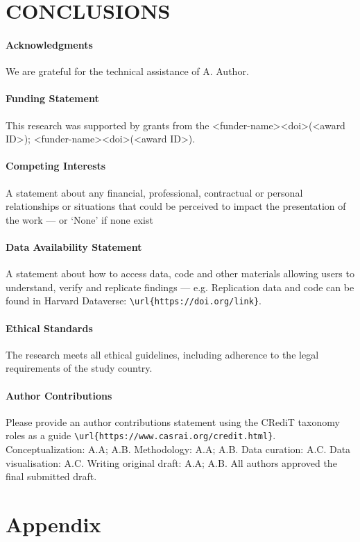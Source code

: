 \documentclass[
  journal=pasa,
  manuscript=research-paper,
  year=202X,
  volume=YY,
]{cup-journal}
\begin{document}
\section{CONCLUSIONS}
\label{sec:conclusions}

\newpage
\paragraph{Acknowledgments}
We are grateful for the technical assistance of A. Author.

\paragraph{Funding Statement}
This research was supported by grants from the <funder-name><doi>(<award ID>); <funder-name><doi>(<award ID>).

\paragraph{Competing Interests}
A statement about any financial, professional, contractual or personal relationships or situations that could be perceived to impact the presentation of the work --- or `None' if none exist

\paragraph{Data Availability Statement}
A statement about how to access data, code and other materials allowing users to understand, verify and replicate findings --- e.g. Replication data and code can be found in Harvard Dataverse: \verb+\url{https://doi.org/link}+.

\paragraph{Ethical Standards}
The research meets all ethical guidelines, including adherence to the legal requirements of the study country.

\paragraph{Author Contributions}
Please provide an author contributions statement using the CRediT taxonomy roles as a guide {\verb+\url{https://www.casrai.org/credit.html}+}. Conceptualization: A.A; A.B. Methodology: A.A; A.B. Data curation: A.C. Data visualisation: A.C. Writing original draft: A.A; A.B. All authors approved the final submitted draft.

\printendnotes


\appendix

\section{Appendix}
\end{document}
